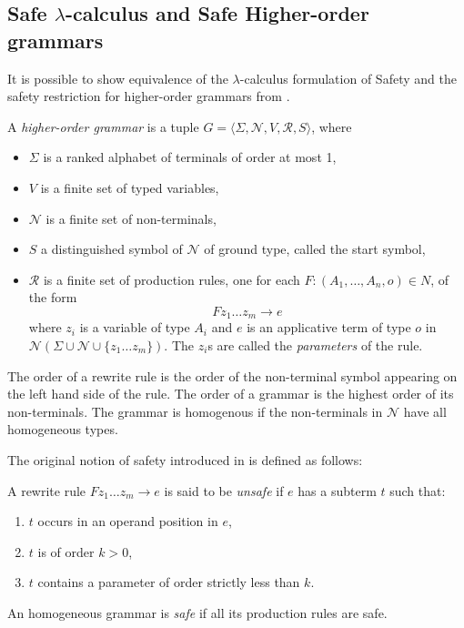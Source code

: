 \documentclass{llncs}
\newcommand\union{\cup}
\begin{document}
\subsection{Safe $\lambda$-calculus and Safe Higher-order grammars}
It is possible to show equivalence of the $\lambda$-calculus formulation of Safety and the
safety restriction for higher-order grammars from \cite{KNU02}.
\begin{definition}
A \emph{higher-order grammar} is a tuple $G =
\langle \Sigma, \mathcal{N}, V, \mathcal{R}, S \rangle$, where
\begin{itemize}
\item $\Sigma$ is a ranked alphabet of terminals of order at most 1,
\item $V$ is a finite set of typed variables,
\item $\mathcal{N}$ is a finite set of non-terminals,
\item $S$ a distinguished symbol of $\mathcal{N}$ of ground type, called the start symbol,
\item $\mathcal{R}$ is a finite set of production rules, one for each $F : (A_1, \ldots, A_n, o) \in N$, of the form
    $$ F z_1 \ldots z_m \rightarrow e$$
where $z_i$ is a variable of type $A_i$ and $e$ is an applicative
term of type $o$ in $\mathcal{N}(\Sigma \union \mathcal{N} \union
\{z_1 \ldots z_m \} )$. The $z_i$s are called the \emph{parameters}
of the rule.
\end{itemize}
\end{definition}
The order of a rewrite rule is the order of the non-terminal symbol
appearing on the left hand side of the rule. The order of a grammar
is the highest order of its non-terminals.
The grammar is homogenous if the non-terminals in $\mathcal{N}$ have all homogeneous types.


The original notion of safety introduced in \cite{KNU02} is defined as follows:
\begin{definition}
  A rewrite rule $F z_1 \ldots z_m \rightarrow e$ is said to be \emph{unsafe} if $e$ has a subterm $t$ such that:
  \begin{enumerate}
    \item $t$ occurs in an operand position in $e$,
    \item $t$ is of order $k>0$,
    \item $t$ contains a parameter of order strictly less than $k$.
  \end{enumerate}
An homogeneous grammar is \emph{safe} if all its production rules are safe.
\end{definition}
\end{document}
